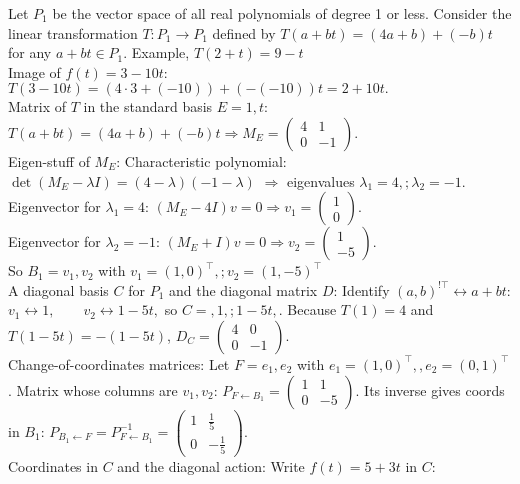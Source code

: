 \documentclass{article}
\begin{document}
\begin{multicols*}{2}
\vfill\columnbreak
Let $P_1$ be the vector space of all real polynomials of degree 1 or less. Consider the linear transformation
$T : P_1 \rightarrow P_1$ defined by $T(a + bt) = (4a + b) + (-b)t$ for any $a + bt \in P_1$. Example, $T(2 + t) = 9 - t$
\\Image of $f(t)=3-10t$: $T(3-10t)=(4\cdot 3 + (-10)) + (-(-10))t = 2 + 10t.$
\\Matrix of $T$ in the standard basis $E={1,t}$: $T(a+bt)=(4a+b) + (-b)t \Longrightarrow M_E=\begin{pmatrix}4 & 1\\ 0 & -1\end{pmatrix}.$
\\Eigen-stuff of $M_E$: Characteristic polynomial: $\det(M_E-\lambda I)=(4-\lambda)(-1-\lambda)$
$\Longrightarrow$ eigenvalues $\lambda_1=4,;\lambda_2=-1$.
\\Eigenvector for $\lambda_1=4$: $(M_E-4I)v=0\Longrightarrow v_1=\begin{pmatrix}1\\0\end{pmatrix}.$
\\Eigenvector for $\lambda_2=-1$: $(M_E+I)v=0\Longrightarrow v_2=\begin{pmatrix}1\\-5\end{pmatrix}.$
\\So $B_1={v_1,v_2}$ with $v_1=(1,0)^{\top},;v_2=(1,-5)^{\top}$
\\A diagonal basis $C$ for $P_1$ and the diagonal matrix $D$: Identify $(a,b)^{!\top}\leftrightarrow a+bt$:
$v_1\leftrightarrow 1,\qquad v_2\leftrightarrow 1-5t,$
so $C={,1,;1-5t,}$. Because $T(1)=4$ and $T(1-5t)=-(1-5t)$, $D_{C}=\begin{pmatrix}4 & 0\\ 0 & -1\end{pmatrix}.$
\\Change-of-coordinates matrices: Let $F={e_1,e_2}$ with $e_1=(1,0)^{\top},,e_2=(0,1)^{\top}$. Matrix whose columns are $v_1,v_2$: $P_{F\leftarrow B_1}=\begin{pmatrix}1 & 1\\ 0 & -5\end{pmatrix}.$
Its inverse gives coords in $B_1$:
$P_{B_1\leftarrow F}=P_{F\leftarrow B_1}^{-1}=\begin{pmatrix}1 & \tfrac15\\ 0 & -\tfrac15\end{pmatrix}.$
\\Coordinates in $C$ and the diagonal action: Write $f(t)=5+3t$ in $C$:

\end{multicols*}
\end{document}
